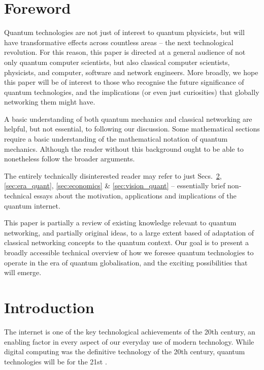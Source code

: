\documentclass[aps,rmp,twocolumn,amsmath,amssymb,nofootinbib,superscriptaddress,longbibliography,floatfix]{revtex4-1}
\begin{document}
\tableofcontents

%
%

\section{Foreword}

Quantum technologies are not just of interest to quantum physicists, but will have transformative effects across countless areas -- the next technological revolution. For this reason, this paper is directed at a general audience of not only quantum computer scientists, but also classical computer scientists, physicists, and computer, software and network engineers. More broadly, we hope this paper will be of interest to those who recognise the future significance of quantum technologies, and the implications (or even just curiosities) that globally networking them might have.

A basic understanding of both quantum mechanics \cite{bib:Sakurai94} and classical networking are helpful, but not essential, to following our discussion. Some mathematical sections require a basic understanding of the mathematical notation of quantum mechanics. Although the reader without this background ought to be able to nonetheless follow the broader arguments.

The entirely technically disinterested reader may refer to just Secs.~\ref{sec:introduction}, \ref{sec:era_quant}, \ref{sec:economics} \& \ref{sec:vision_quant} -- essentially brief non-technical essays about the motivation, applications and implications of the quantum internet.

This paper is partially a review of existing knowledge relevant to quantum networking, and partially original ideas, to a large extent based of adaptation of classical networking concepts to the quantum context. Our goal is to present a broadly accessible technical overview of how we foresee quantum technologies to operate in the era of quantum globalisation, and the exciting possibilities that will emerge.

%
%

\section{Introduction} \label{sec:introduction}

The internet is one of the key technological achievements of the 20th century, an enabling factor in every aspect of our everyday use of modern technology. While digital computing was the definitive technology of the 20th century, quantum technologies will be for the 21st \cite{bib:NielsenChuang00, bib:Bennett00}. 
\end{document}
